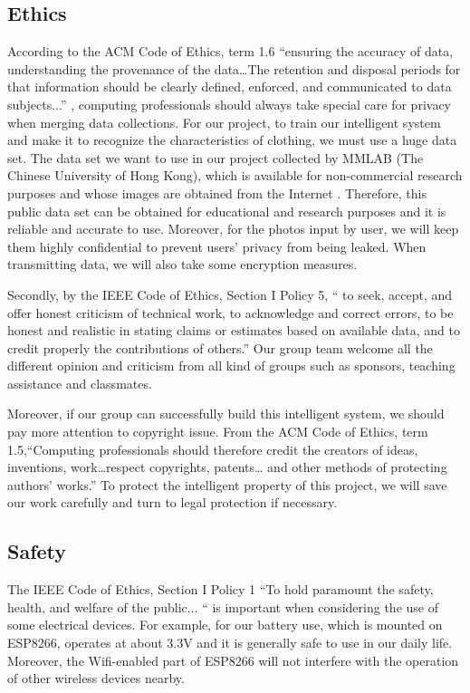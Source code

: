 
\subsection{Ethics}  
\noindent According to the ACM Code of Ethics, term 1.6 “ensuring the accuracy of data, understanding the provenance of the data…The retention and disposal periods for that information should be clearly defined, enforced, and communicated to data subjects...” \cite{acm-ethics}, computing professionals should always take special care for privacy when merging data collections. For our project, to train our intelligent system and make it to recognize the characteristics of clothing, we must use a huge data set. The data set we want to use in our project collected by MMLAB (The Chinese University of Hong Kong), which is available for non-commercial research purposes and whose images are obtained from the Internet \cite{mmfashion}. Therefore, this public data set can be obtained for educational and research purposes and it is reliable and accurate to use. Moreover, for the photos input by user, we will keep them highly confidential to prevent users' privacy from being leaked. When transmitting data, we will also take some encryption measures.

\noindent Secondly, by the IEEE Code of Ethics, Section I Policy 5, “ to seek, accept, and offer honest
criticism of technical work, to acknowledge and correct errors, to be honest and realistic in stating claims or estimates based on available data, and to credit properly the
contributions of others.”\cite{ieee-ethics} Our group team welcome all the different opinion and criticism from all kind of groups such as sponsors, teaching assistance and classmates.  

\noindent Moreover, if our group can successfully build this intelligent system, we should pay more attention to copyright issue. From the ACM Code of Ethics, term 1.5,“Computing professionals should therefore credit the creators of ideas, inventions, work…respect copyrights, patents… and other methods of protecting authors' works.”\cite{acm-ethics} To protect the intelligent property of this project, we will save our work carefully and turn to legal protection if necessary.  

\subsection{Safety} 
\noindent The IEEE Code of Ethics, Section I Policy 1 “To hold paramount the safety, health, and welfare of the public... “ is important when considering the use of some electrical devices. For example, for our battery use, which is mounted on ESP8266, operates at about 3.3V and it is generally safe to use in our daily life. Moreover, the Wifi-enabled part of ESP8266 will not interfere with the operation of other wireless devices nearby.  



